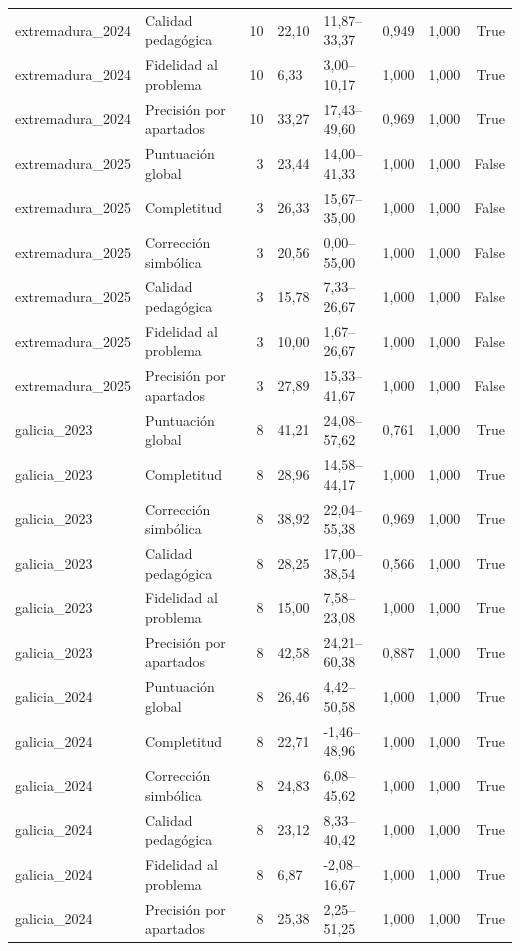 \begin{tabular}{llrllllr}
extremadura\_2024 & Calidad pedagógica & 10 & 22,10 & 11,87–33,37 & 0,949 & 1,000 & True \\
extremadura\_2024 & Fidelidad al problema & 10 & 6,33 & 3,00–10,17 & 1,000 & 1,000 & True \\
extremadura\_2024 & Precisión por apartados & 10 & 33,27 & 17,43–49,60 & 0,969 & 1,000 & True \\
extremadura\_2025 & Puntuación global & 3 & 23,44 & 14,00–41,33 & 1,000 & 1,000 & False \\
extremadura\_2025 & Completitud & 3 & 26,33 & 15,67–35,00 & 1,000 & 1,000 & False \\
extremadura\_2025 & Corrección simbólica & 3 & 20,56 & 0,00–55,00 & 1,000 & 1,000 & False \\
extremadura\_2025 & Calidad pedagógica & 3 & 15,78 & 7,33–26,67 & 1,000 & 1,000 & False \\
extremadura\_2025 & Fidelidad al problema & 3 & 10,00 & 1,67–26,67 & 1,000 & 1,000 & False \\
extremadura\_2025 & Precisión por apartados & 3 & 27,89 & 15,33–41,67 & 1,000 & 1,000 & False \\
galicia\_2023 & Puntuación global & 8 & 41,21 & 24,08–57,62 & 0,761 & 1,000 & True \\
galicia\_2023 & Completitud & 8 & 28,96 & 14,58–44,17 & 1,000 & 1,000 & True \\
galicia\_2023 & Corrección simbólica & 8 & 38,92 & 22,04–55,38 & 0,969 & 1,000 & True \\
galicia\_2023 & Calidad pedagógica & 8 & 28,25 & 17,00–38,54 & 0,566 & 1,000 & True \\
galicia\_2023 & Fidelidad al problema & 8 & 15,00 & 7,58–23,08 & 1,000 & 1,000 & True \\
galicia\_2023 & Precisión por apartados & 8 & 42,58 & 24,21–60,38 & 0,887 & 1,000 & True \\
galicia\_2024 & Puntuación global & 8 & 26,46 & 4,42–50,58 & 1,000 & 1,000 & True \\
galicia\_2024 & Completitud & 8 & 22,71 & -1,46–48,96 & 1,000 & 1,000 & True \\
galicia\_2024 & Corrección simbólica & 8 & 24,83 & 6,08–45,62 & 1,000 & 1,000 & True \\
galicia\_2024 & Calidad pedagógica & 8 & 23,12 & 8,33–40,42 & 1,000 & 1,000 & True \\
galicia\_2024 & Fidelidad al problema & 8 & 6,87 & -2,08–16,67 & 1,000 & 1,000 & True \\
galicia\_2024 & Precisión por apartados & 8 & 25,38 & 2,25–51,25 & 1,000 & 1,000 & True \\

\end{tabular}
